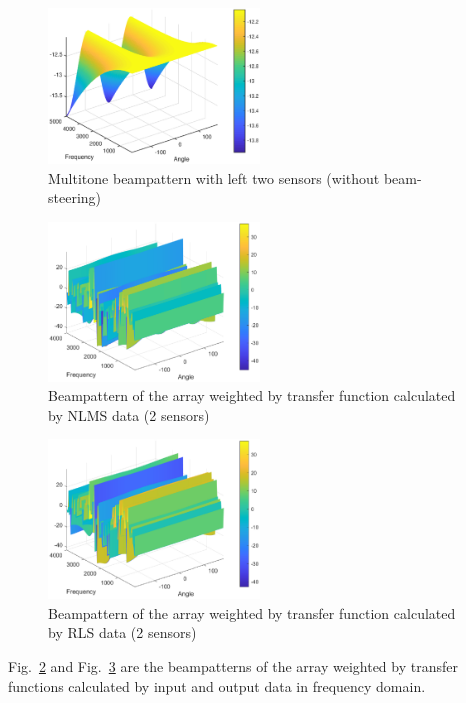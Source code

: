 \documentclass[onecolumn, conference]{IEEEtran}
\begin{document}
\begin{figure}[htbp]
	\centerline{\includegraphics[width=0.5\textwidth]{img/multi_left2.eps}}
	\caption{Multitone beampattern with left two sensors (without beam-steering)}
	\label{Multitone beampattern with left two sensors (without beam-steering)}
\end{figure}
\begin{figure}[htbp]
	\centerline{\includegraphics[width=0.5\textwidth]{img/trans_NMLS_2sensor.eps}}
	\caption{Beampattern of the array weighted by transfer function calculated by NLMS data (2 sensors)}
	\label{Transfer function calculated by NLMS data}
\end{figure}
\begin{figure}[htbp]
	\centerline{\includegraphics[width=0.5\textwidth]{img/trans_RLS_2sensor.eps}}
	\caption{Beampattern of the array weighted by transfer function calculated by RLS data (2 sensors)}
	\label{Transfer function calculated by RLS data (2 sensors)}
\end{figure}

Fig.~\ref{Transfer function calculated by NLMS data} and Fig.~\ref{Transfer function calculated by RLS data (2 sensors)} are the beampatterns of the array weighted by transfer functions calculated by input and output data in frequency domain.
\end{document}
